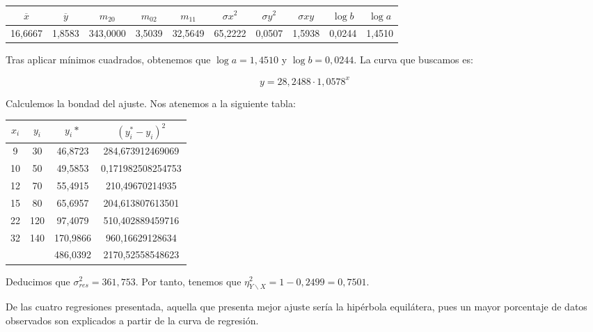 \vspace{1em}

\tiny
\begin{tabular}{|c|c|c|c|c|c|c|c|c|c|}
	\hline
	$\overline{x}$ & $\overline{y}$ & $m_{20}$ & $m_{02}$ & $m_{11}$ & $\sigma{x}^2$ & $\sigma{y}^2$ & $\sigma{xy}$ & $\log{b}$ & $\log{a}$  \\ \hline
16,6667 & 1,8583 & 343,0000 & 3,5039 & 32,5649 & 65,2222 & 0,0507 & 1,5938 & 0,0244 & 1,4510 \\ \hline
\end{tabular}
\normalsize

\vspace{1em}

Tras aplicar mínimos cuadrados, obtenemos que $\log{a} = 1,4510$ y $\log{b}=0,0244$. La curva que buscamos es:

$$y=28,2488\cdot1,0578^{x}$$

Calculemos la bondad del ajuste. Nos atenemos a la siguiente tabla:

\begin{center}
	\begin{tabular}{|c|c|c|c|}
	\hline
	$x_i$ & $y_i$ & $y_i*$ & $(y_i^*-y_i)^2$ \\ \hline
	9 & 30 & 46,8723 & 284,673912469069 \\ 
	10 & 50 & 49,5853 & 0,171982508254753 \\ 
	12 & 70 & 55,4915 & 210,49670214935 \\ 
	15 & 80 & 65,6957 & 204,613807613501 \\ 
	22 & 120 & 97,4079 & 510,402889459716 \\ 
	32 & 140 & 170,9866 & 960,16629128634 \\ \hline
	\multicolumn{1}{|l|}{} & \multicolumn{1}{l|}{} & 486,0392 & 2170,52558548623 \\ \hline
\end{tabular}
\end{center}

Deducimos que $\sigma_{res}^2 = 361,753$. Por tanto, tenemos que $\eta_{Y\backslash X}^2 = 1 - 0,2499 = 0,7501$.

\subproblem

De las cuatro regresiones presentada, aquella que presenta mejor ajuste sería la hipérbola equilátera, pues un mayor porcentaje de datos observados son explicados a partir de la curva de regresión.